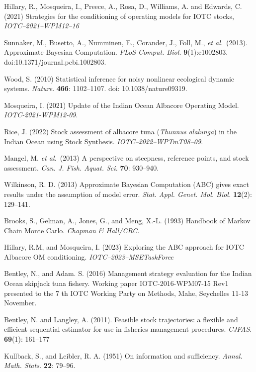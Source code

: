 \documentclass[11pt]{article}
\newcommand{\etal}{\textit{et al.}}
\begin{document}
\clearpage
\begin{thebibliography}{99}
       
     Hillary, R., Mosqueira, I., Preece, A., Rosa, D., Williams, A. and Edwards, C. (2021) Strategies for the conditioning of operating models for IOTC stocks, \textit{IOTC--2021--WPM12--16}
    
     Sunnaker, M., Busetto, A., Numminen, E., Corander, J., Foll, M., \etal~(2013). Approximate Bayesian Computation. \textit{PLoS Comput. Biol.} {\bf 9}(1):e1002803. doi:10.1371/journal.pcbi.1002803.
         
     Wood, S. (2010) Statistical inference for noisy nonlinear ecological dynamic systems. \textit{Nature}. {\bf 466}: 1102--1107. doi: 10.1038/nature09319.

     Mosqueira, I. (2021) Update of the Indian Ocean Albacore Operating Model. \textit{IOTC-2021-WPM12-09}. 

     Rice, J. (2022) Stock assessment of albacore tuna (\textit{Thunnus alalunga}) in the Indian Ocean using Stock Synthesis. \textit{IOTC--2022--WPTmT08--09}.

     Mangel, M. \etal~(2013) A perspective on steepness, reference points, and stock assessment. \textit{Can. J. Fish. Aquat. Sci.} {\bf 70}: 930--940.

     Wilkinson, R. D. (2013) Approximate Bayesian Computation (ABC) gives exact results under the assumption of model error. \textit{Stat. Appl. Genet. Mol. Biol.} {\bf 12}(2): 129--141.
    
     Brooks, S., Gelman, A., Jones, G., and Meng, X.-L. (1993) Handbook of Markov Chain Monte Carlo. \textit{Chapman \& Hall/CRC}.

     Hillary, R.M, and Mosqueira, I. (2023) Exploring the ABC approach for IOTC Albacore
        OM conditioning. \textit{IOTC--2023--MSETaskForce}
    
     Bentley, N., and Adam. S. (2016) Management strategy evaluation for the Indian Ocean skipjack tuna fishery. Working paper IOTC-2016-WPM07-15 Rev1 presented to the 7 th IOTC Working Party on Methods, Mahe, Seychelles 11-13 November.
    
     Bentley, N. and Langley, A. (2011). Feasible stock trajectories: a flexible and efficient sequential estimator for use in fisheries management procedures. \textit{CJFAS}. {\bf 69}(1): 161--177  

     Kullback, S., and Leibler, R. A. (1951) On information and sufficiency. \textit{Annal. Math. Stats.} {\bf 22}: 79--96.

\end{thebibliography}
\end{document}
